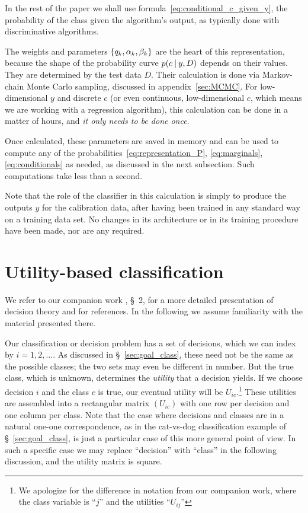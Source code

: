 \documentclass[a4paper,12pt,%
onecolumn,oneside,article,%
british%
]{memoir}
\DeclarePairedDelimiter\set{\{}{\}} %
\renewcommand*{\|}[1][]{\nonscript\:#1\vert\nonscript\:\mathopen{}}
\newcommand*{\sect}{\S}%
\begin{document}
In the rest of the paper we shall use formula~\eqref{eq:conditional_c_given_y}, the probability of the class given the algorithm's output, as typically done with discriminative algorithms. 

\medskip

The weights and parameters $\set{q_{k}, \alpha_{k}, \beta_{k}}$ are the heart of this representation, because the shape of the probability curve $p(c \| y, D)$ depends on their values. They are determined by the test data $D$. Their calculation is done via Markov-chain Monte Carlo sampling, discussed in appendix~\ref{sec:MCMC}. For low-dimensional $y$ and discrete $c$ (or even continuous, low-dimensional $c$, which means we are working with a regression algorithm), this calculation can be done in a matter of hours, and \emph{it only needs to be done once}.

Once calculated, these parameters are saved in memory and can be used to compute any of the probabilities~\eqref{eq:representation_P}, \eqref{eq:marginals}, \eqref{eq:conditionals} as needed, as discussed in the next subsection. Such computations take less than a second.

Note that the role of the classifier in this calculation is simply to produce the outputs $y$ for the calibration data, after having been trained in any standard way on a training data set. No changes in its architecture or in its training procedure have been made, nor are any required.



\section{Utility-based classification}
\label{sec:utility_classification}

We refer to our companion work \cite{dyrlandetal2022}, \sect~2, for a more detailed presentation of decision theory and for references. In the following we assume familiarity with the material presented there.

Our classification or decision problem has a set of decisions, which we can index by $i = 1,2,\dotsc$. As discussed in \sect~\ref{sec:goal_class}, these need not be the same as the possible classes; the two sets may even be different in number. But the true class, which is unknown, determines the \emph{utility} that a decision yields. If we choose decision $i$ and the class $c$ is true, our eventual utility will be $U_{ic}$.\footnote{We apologize for the difference in notation from our companion work, where the class variable is \enquote{$j$} and the utilities \enquote{$U_{ij}$}} These utilities are assembled into a rectangular matrix $(U_{ic})$ with one row per decision and one column per class. Note that the case where decisions and classes are in a natural one-one correspondence, as in the cat-vs-dog classification example of \sect~\ref{sec:goal_class}, is just a particular case of this more general point of view. In such a specific case we may replace \enquote{decision} with \enquote{class} in the following discussion, and the utility matrix is square.
\end{document}
